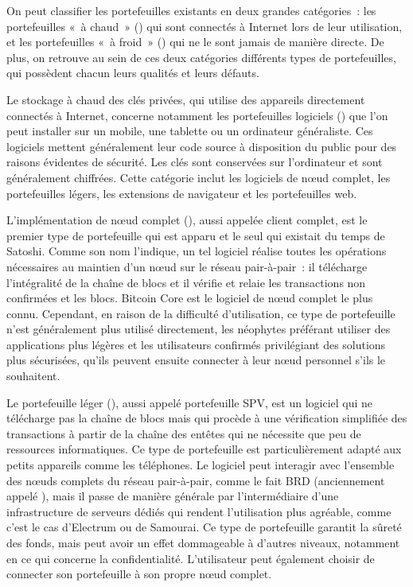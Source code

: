 On peut classifier les portefeuilles existants en deux grandes catégories~: les portefeuilles «~à chaud~» () qui sont connectés à Internet lors de leur utilisation, et les portefeuilles «~à froid~» () qui ne le sont jamais de manière directe. De plus, on retrouve au sein de ces deux catégories différents types de portefeuilles, qui possèdent chacun leurs qualités et leurs défauts.


Le stockage à chaud des clés privées, qui utilise des appareils directement connectés à Internet, concerne notamment les portefeuilles logiciels () que l'on peut installer sur un mobile, une tablette ou un ordinateur généraliste. Ces logiciels mettent généralement leur code source à disposition du public pour des raisons évidentes de sécurité. Les clés sont conservées sur l'ordinateur et sont généralement chiffrées. Cette catégorie inclut les logiciels de nœud complet, les portefeuilles légers, les extensions de navigateur et les portefeuilles web.

L'implémentation de nœud complet (), aussi appelée client complet, est le premier type de portefeuille qui est apparu et le seul qui existait du temps de Satoshi. Comme son nom l'indique, un tel logiciel réalise toutes les opérations nécessaires au maintien d'un nœud sur le réseau pair-à-pair~: il télécharge l'intégralité de la chaîne de blocs et il vérifie et relaie les transactions non confirmées et les blocs. Bitcoin Core est le logiciel de nœud complet le plus connu. Cependant, en raison de la difficulté d'utilisation, ce type de portefeuille n'est généralement plus utilisé directement, les néophytes préférant utiliser des applications plus légères et les utilisateurs confirmés privilégiant des solutions plus sécurisées, qu'ils peuvent ensuite connecter à leur nœud personnel s'ils le souhaitent.

Le portefeuille léger (), aussi appelé portefeuille SPV, est un logiciel qui ne télécharge pas la chaîne de blocs mais qui procède à une vérification simplifiée des transactions à partir de la chaîne des entêtes qui ne nécessite que peu de ressources informatiques. Ce type de portefeuille est particulièrement adapté aux petits appareils comme les téléphones. Le logiciel peut interagir avec l'ensemble des nœuds complets du réseau pair-à-pair, comme le fait BRD (anciennement appelé ), mais il passe de manière générale par l'intermédiaire d'une infrastructure de serveurs dédiés qui rendent l'utilisation plus agréable, comme c'est le cas d'Electrum ou de Samourai. Ce type de portefeuille garantit la sûreté des fonds, mais peut avoir un effet dommageable à d'autres niveaux, notamment en ce qui concerne la confidentialité. L'utilisateur peut également choisir de connecter son portefeuille à son propre nœud complet.


